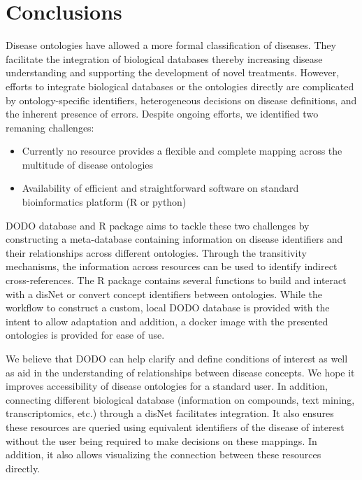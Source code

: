 \documentclass[9pt,a4paper,]{extarticle}
\begin{document}
\hypertarget{conclusions}{%
\section{Conclusions}\label{conclusions}}

Disease ontologies have allowed a more formal classification of diseases. They facilitate the integration of biological databases thereby increasing disease understanding and supporting the development of novel treatments. However, efforts to integrate biological databases or the ontologies directly are complicated by ontology-specific identifiers, heterogeneous decisions on disease definitions, and the inherent presence of errors. Despite ongoing efforts, we identified two remaning challenges:

\begin{itemize}
\item
  Currently no resource provides a flexible and complete mapping across the multitude of disease ontologies
\item
  Availability of efficient and straightforward software on standard bioinformatics platform (R or python)
\end{itemize}

DODO database and R package aims to tackle these two challenges by constructing a meta-database containing information on disease identifiers and their relationships across different ontologies. Through the transitivity mechanisms, the information across resources can be used to identify indirect cross-references. The R package contains several functions to build and interact with a disNet or convert concept identifiers between ontologies. While the workflow to construct a custom, local DODO database is provided with the intent to allow adaptation and addition, a docker image with the presented ontologies is provided for ease of use.

We believe that DODO can help clarify and define conditions of interest as well as aid in the understanding of relationships between disease concepts. We hope it improves accessibility of disease ontologies for a standard user. In addition, connecting different biological database (information on compounds, text mining, transcriptomics, etc.) through a disNet facilitates integration. It also ensures these resources are queried using equivalent identifiers of the disease of interest without the user being required to make decisions on these mappings. In addition, it also allows visualizing the connection between these resources directly.
\end{document}
